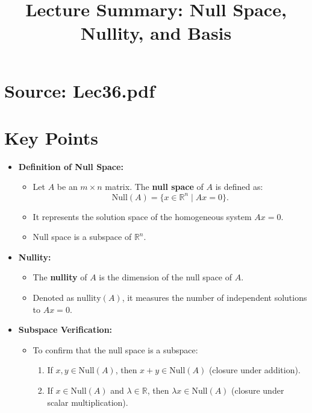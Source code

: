 \documentclass{article}
\title{Lecture Summary: Null Space, Nullity, and Basis}
\author{}
\date{}
\begin{document}
\maketitle

\section*{Source: Lec36.pdf}

\section*{Key Points}

\begin{itemize}
  \item \textbf{Definition of Null Space:}
    \begin{itemize}
      \item Let $A$ be an $m \times n$ matrix. The \textbf{null space} of $A$ is defined as:
        \[
          \text{Null}(A) = \{x \in \mathbb{R}^n \mid Ax = 0\}.
        \]
      \item It represents the solution space of the homogeneous system $Ax = 0$.
      \item Null space is a subspace of $\mathbb{R}^n$.
    \end{itemize}

  \item \textbf{Nullity:}
    \begin{itemize}
      \item The \textbf{nullity} of $A$ is the dimension of the null space of $A$.
      \item Denoted as $\text{nullity}(A)$, it measures the number of independent solutions to $Ax = 0$.
    \end{itemize}

  \item \textbf{Subspace Verification:}
    \begin{itemize}
      \item To confirm that the null space is a subspace:
        \begin{enumerate}
          \item If $x, y \in \text{Null}(A)$, then $x + y \in \text{Null}(A)$ (closure under addition).
          \item If $x \in \text{Null}(A)$ and $\lambda \in \mathbb{R}$, then $\lambda x \in \text{Null}(A)$ (closure under scalar multiplication).
        \end{enumerate}
    \end{itemize}


\end{itemize}
\end{document}
